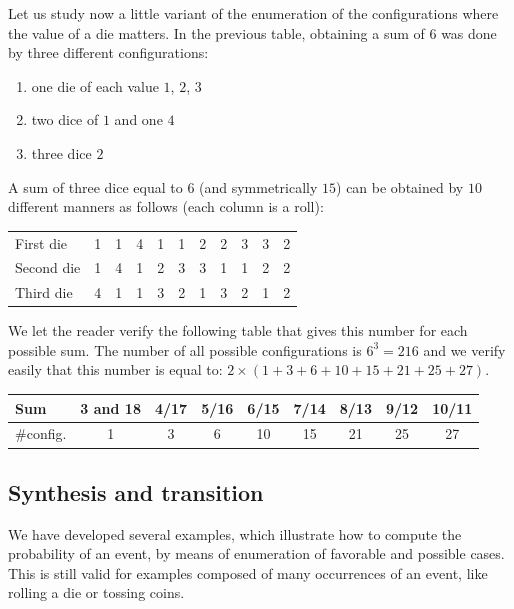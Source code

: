 \bigskip
Let us study now a little variant of the enumeration of the configurations
where the value of a die matters.
In the previous table, obtaining a sum of $6$ was done by three different configurations:
\begin{enumerate}
\item one die of each value $1$, $2$, $3$
\item two dice of $1$ and one $4$
\item three dice $2$
\end{enumerate}

A sum of three dice equal to $6$ (and symmetrically $15$) can be obtained by $10$ different manners as follows
(each column is a roll):
\medskip

\begin{tabular}{|l|c|c|c|c|c|c|c|c|c|c|}
\hline
First die & 1 & 1 & 4 & 1 & 1 & 2 & 2 & 3 & 3 & 2   \\

Second die & 1 & 4 & 1 & 2 & 3 & 3 & 1 & 1 & 2 & 2   \\

Third die & 4 & 1 & 1 & 3 & 2 & 1 & 3 & 2 & 1 & 2  \\
\hline
\end{tabular}

\medskip

We let the reader verify the following table that gives this number for each possible sum.
The number of all possible configurations is $6^3=216$ and we verify easily that this number is equal to:
$2 \times (1 + 3 + 6 + 10 + 15 + 21 + 25 + 27)$.
\medskip

\begin{tabular}{|l|c|c|c|c|c|c|c|c|}
\hline
Sum & 3 and 18 & 4/17 & 5/16 & 6/15 & 7/14 & 8/13 & 9/12 & 10/11  \\
\hline
$\#$config. & 1 & 3 & 6 & 10 & 15 & 21 & 25 & 27  \\
\hline
\end{tabular}
\medskip


\subsection{Synthesis and transition}

We have developed several examples, which illustrate how to compute the probability of an event,
by means of enumeration of favorable and possible cases. 
This is still valid for examples composed of many occurrences of an event,
like rolling a die or tossing coins. 

